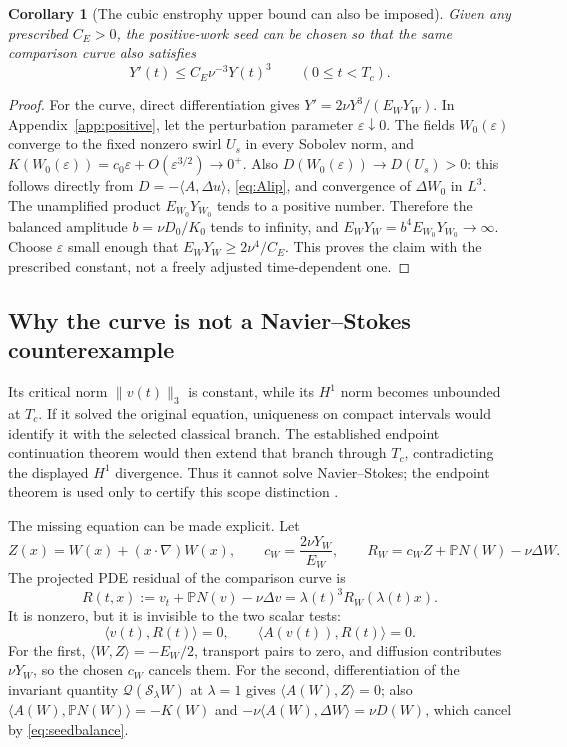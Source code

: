 \documentclass[11pt,a4paper]{article}
\newtheorem{corollary}[theorem]{Corollary}
\theoremstyle{definition}\newtheorem{definition}[theorem]{Definition}
\theoremstyle{remark}\newtheorem{remark}[theorem]{Remark}
\newcommand{\Q}{\mathcal Q}
\newcommand{\PP}{\mathbb P}
\newcommand{\norm}[1]{\lVert #1\rVert}
\newcommand{\ip}[2]{\langle #1,#2\rangle}
\numberwithin{equation}{section}
\begin{document}
\begin{corollary}[The cubic enstrophy upper bound can also be imposed]\label{cor:curveenstrophy}
Given any prescribed $C_E>0$, the positive-work seed can be chosen so that the same comparison curve also satisfies
\[
 Y'(t)\le C_E\nu^{-3}Y(t)^3\qquad(0\le t<T_c).
\]
\end{corollary}
\begin{proof}
For the curve, direct differentiation gives
$Y'=2\nu Y^3/(E_WY_W)$. In Appendix~\ref{app:positive}, let the perturbation parameter $\varepsilon\downarrow0$. The fields $W_0(\varepsilon)$ converge to the fixed nonzero swirl $U_s$ in every Sobolev norm, and $K(W_0(\varepsilon))=c_0\varepsilon+O(\varepsilon^{3/2})\to0^+$. Also $D(W_0(\varepsilon))\to D(U_s)>0$: this follows directly from $D=-\ip{A}{\Delta u}$, \eqref{eq:Alip}, and convergence of $\Delta W_0$ in $L^3$. The unamplified product $E_{W_0}Y_{W_0}$ tends to a positive number. Therefore the balanced amplitude $b=\nu D_0/K_0$ tends to infinity, and
$E_WY_W=b^4E_{W_0}Y_{W_0}\to\infty$. Choose $\varepsilon$ small enough that $E_WY_W\ge2\nu^4/C_E$. This proves the claim with the prescribed constant, not a freely adjusted time-dependent one.
\end{proof}

\subsection{Why the curve is not a Navier--Stokes counterexample}
Its critical norm $\norm{v(t)}_3$ is constant, while its $H^1$ norm becomes unbounded at $T_c$. If it solved the original equation, uniqueness on compact intervals would identify it with the selected classical branch. The established endpoint continuation theorem would then extend that branch through $T_c$, contradicting the displayed $H^1$ divergence. Thus it cannot solve Navier--Stokes; the endpoint theorem is used only to certify this scope distinction \cite{Paper,GKP}.

The missing equation can be made explicit. Let
\[
 Z(x)=W(x)+(x\cdot\nabla)W(x),\qquad c_W=\frac{2\nu Y_W}{E_W},
 \qquad R_W=c_WZ+\PP N(W)-\nu\Delta W.
\]
The projected PDE residual of the comparison curve is
\begin{equation}\label{eq:residualcurve}
 R(t,x):=v_t+\PP N(v)-\nu\Delta v
       =\lambda(t)^3R_W(\lambda(t)x).
\end{equation}
It is nonzero, but it is invisible to the two scalar tests:
\begin{equation}\label{eq:invisible}
 \ip{v(t)}{R(t)}=0,\qquad \ip{A(v(t))}{R(t)}=0.
\end{equation}
For the first, $\ip WZ=-E_W/2$, transport pairs to zero, and diffusion contributes $\nu Y_W$, so the chosen $c_W$ cancels them. For the second, differentiation of the invariant quantity $\Q(\mathscr S_\lambda W)$ at $\lambda=1$ gives $\ip{A(W)}Z=0$; also $\ip{A(W)}{\PP N(W)}=-K(W)$ and $-\nu\ip{A(W)}{\Delta W}=\nu D(W)$, which cancel by \eqref{eq:seedbalance}.
\end{document}

